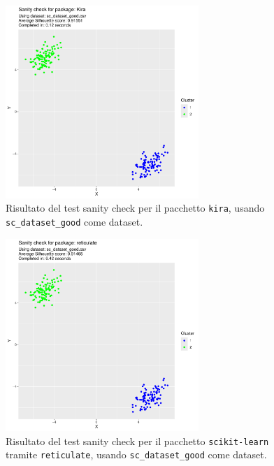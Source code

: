 \documentclass[a4paper, 12pt]{report}
\begin{document}
			\begin{figure}[H]
				\centering
				\includegraphics[width = 0.65\textwidth, page = 1]{results/results_KIRA.pdf}
				\caption{Risultato del test sanity check per il pacchetto \texttt{kira}, usando \texttt{sc\_dataset\_good} come dataset.}
				\label{fig:kiragood}
			\end{figure}

			\begin{figure}[H]
				\centering
				\includegraphics[width = 0.65\textwidth, page = 1]{results/results_RETICULATE.pdf}
				\caption{Risultato del test sanity check per il pacchetto \texttt{scikit-learn} tramite \texttt{reticulate}, usando \texttt{sc\_dataset\_good} come dataset.}
				\label{fig:reticulategood}
			\end{figure}
\end{document}
